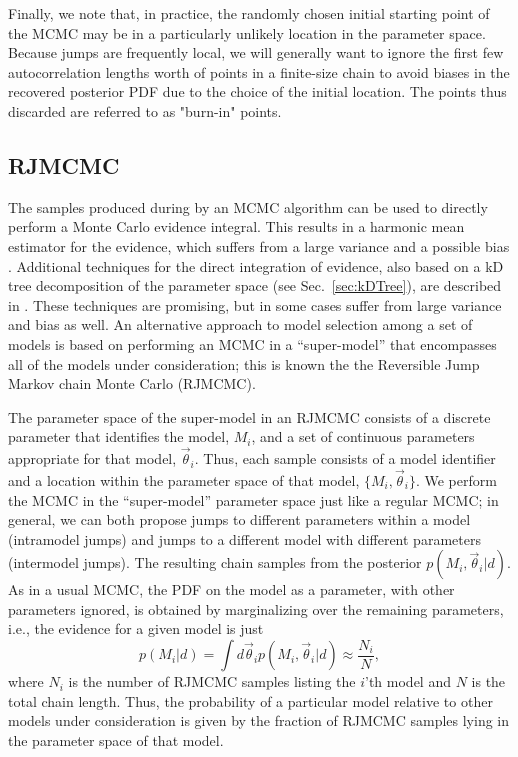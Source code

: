 \documentclass[prd,preprint]{revtex4}
\newcommand{\vtheta}{\vec{\theta}}
\newcommand{\be}{\begin{equation}}
\newcommand{\ee}{\end{equation}}
\begin{document}
Finally, we note that, in practice, the randomly chosen initial
starting point of the MCMC may be in a particularly unlikely location
in the parameter space.  Because jumps are frequently local, we will
generally want to ignore the first few autocorrelation lengths worth
of points in a finite-size chain to avoid biases in the recovered
posterior PDF due to the choice of the initial location.  The points
thus discarded are referred to as "burn-in" points.

\subsection{RJMCMC}

The samples produced during by an MCMC algorithm can be used to
directly perform a Monte Carlo evidence integral.  This results in a
harmonic mean estimator for the evidence, which suffers from a large
variance and a possible bias
\cite{NewtonRaftery:1994,Chib:1995,vanHaasteren:2009}.  Additional
techniques for the direct integration of evidence, also based on a kD
tree decomposition of the parameter space (see Sec.~\ref{sec:kDTree}),
are described in \cite{Weinberg2009}.  These techniques are promising,
but in some cases suffer \cite{Farr2010} from large variance and bias
as well.  An alternative approach to model selection among a set of
models is based on performing an MCMC in a ``super-model'' that
encompasses all of the models under consideration; this is known the
the Reversible Jump Markov chain Monte Carlo (RJMCMC).

The parameter space of the super-model in an RJMCMC consists of a
discrete parameter that identifies the model, $M_i$, and a set of
continuous parameters appropriate for that model, $\vtheta_i$.  Thus,
each sample consists of a model identifier and a location within the
parameter space of that model, $\{M_i, \vtheta_i\}$.  We perform the
MCMC in the ``super-model'' parameter space just like a regular MCMC;
in general, we can both propose jumps to different parameters within a
model (intramodel jumps) and jumps to a different model with different
parameters (intermodel jumps).  The resulting chain samples from the
posterior $p(M_i,\vtheta_i|d)$.  As in a usual MCMC, the PDF on the
model as a parameter, with other parameters ignored, is obtained by
marginalizing over the remaining parameters, i.e., the evidence for a
given model is just
%
\be
p(M_i|d) = \int d\vtheta_i p(M_i, \vtheta_i|d) \approx \frac{N_i}{N},
\ee
%
where $N_i$ is the number of RJMCMC samples listing the $i$'th model
and $N$ is the total chain length.  Thus, the probability of a
particular model relative to other models under consideration is given
by the fraction of RJMCMC samples lying in the parameter space of that
model.
 
\end{document}
